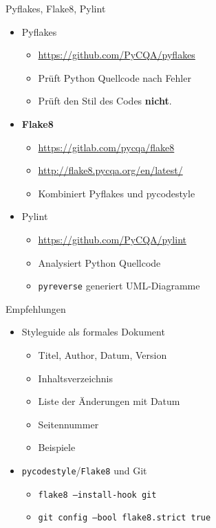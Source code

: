 \documentclass{beamer}
\begin{document}
\begin{frame}{Pyflakes, Flake8, Pylint}
  \begin{itemize}
    \item Pyflakes
      \begin{itemize}
        \item \url{https://github.com/PyCQA/pyflakes}
        \item Prüft Python Quellcode nach Fehler
        \item Prüft den Stil des Codes \textbf{nicht}.
      \end{itemize}
    \item \textbf{Flake8}
      \begin{itemize}
        \item \url{https://gitlab.com/pycqa/flake8}
        \item \url{http://flake8.pycqa.org/en/latest/}
        \item Kombiniert Pyflakes und pycodestyle
      \end{itemize}
    \item Pylint
      \begin{itemize}
        \item \url{https://github.com/PyCQA/pylint}
        \item Analysiert Python Quellcode
        \item \texttt{pyreverse} generiert UML-Diagramme
      \end{itemize}
  \end{itemize}
\end{frame}

\begin{frame}{Empfehlungen}
\begin{itemize}
  \item Styleguide als formales Dokument
  \begin{itemize}
    \item Titel, Author, Datum, Version
    \item Inhaltsverzeichnis
    \item Liste der Änderungen mit Datum
    \item Seitennummer
    \item Beispiele
  \end{itemize}
  \item \texttt{pycodestyle}/\texttt{Flake8} und Git
  \begin{itemize}
    \item \texttt{flake8 --install-hook git}
    \item \texttt{git config --bool flake8.strict true}
  \end{itemize}
\end{itemize}
\end{frame}
\end{document}
